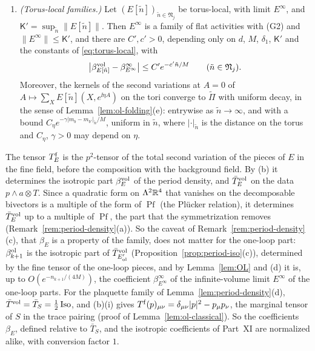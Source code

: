\begin{lemma}
\begin{enumerate}[label=(\alph*)]
\item \emph{(Torus-local families.)} Let $(E[\tilde n])_{\tilde n\in\mathfrak N_j}$ be torus-local, with limit $E^\infty$, and $\mathsf K'=\sup_{\tilde n}\|E[\tilde n]\|$. Then $E^\infty$ is a family of flat activities with (G2) and $\|E^\infty\|\le\mathsf K'$, and there are $C',c'>0$, depending only on $d$, $M$, $\delta_1$, $\mathsf K'$ and the constants of \eqref{eq:torus-local}, with
\[
\big|\beta^{\rm vol}_{E[\tilde n]}-\beta^\infty_{E^\infty}\big|\le C'e^{-c'\tilde n/M}\qquad(\tilde n\in\mathfrak N_j).
\]
Moreover, the kernels of the second variations at $A=0$ of $A\mapsto\sum_XE[\tilde n](X,e^{\ii\eta A})$ on the tori converge to $\widetilde\Pi$ with uniform decay, in the sense of Lemma~\ref{lem:ol-folding}(e): entrywise as $\tilde n\to\infty$, and with a bound $C_\eta e^{-\gamma|m_b-m_{b'}|_{\tilde n}/M}$, uniform in $\tilde n$, where $|\cdot|_{\tilde n}$ is the distance on the torus and $C_\eta$, $\gamma>0$ may depend on $\eta$.
\end{enumerate}
\end{lemma}

The tensor $T^{\rm f}_E$ is the $p^2$-tensor of the total second variation of the pieces of $E$ in the fine field, before the composition with the background field. By (b) it determines the isotropic part $\beta^{\rm vol}_E$ of the period density, and $\bar T^{\rm vol}_E$ on the data $p\wedge a\otimes T$. Since a quadratic form on $\Lambda^2\mathbb R^4$ that vanishes on the decomposable bivectors is a multiple of the form of $\operatorname{Pf}$ (the Pl\"ucker relation), it determines $\bar T^{\rm vol}_E$ up to a multiple of $\operatorname{Pf}$, the part that the symmetrization removes (Remark~\ref{rem:period-density}(a)). So the caveat of Remark~\ref{rem:period-density}(c), that $\beta_E$ is a property of the family, does not matter for the one-loop part: $\beta^{\rm ol}_{k+1}$ is the isotropic part of $\bar T^{\rm vol}_{E'_{\rm ol}}$ (Proposition~\ref{prop:period-iso}(c)), determined by the fine tensor of the one-loop pieces, and by Lemma~\ref{lem:OL} and (d) it is, up to $O(e^{-n_{k+1}/(4M)})$, the coefficient $\beta^\infty_{E^\infty}$ of the infinite-volume limit $E^\infty$ of the one-loop parts. For the plaquette family of Lemma~\ref{lem:period-density}(d), $\bar T^{\rm vol}=\bar T_S=\frac12\operatorname{Iso}$, and (b)(i) gives $T^{\rm f}(p)_{\mu\nu}=\delta_{\mu\nu}|p|^2-p_\mu p_\nu$, the marginal tensor of $S$ in the trace pairing (proof of Lemma~\ref{lem:ol-classical}). So the coefficients $\beta_E$, defined relative to $\bar T_S$, and the isotropic coefficients of Part~XI are normalized alike, with conversion factor $1$.

